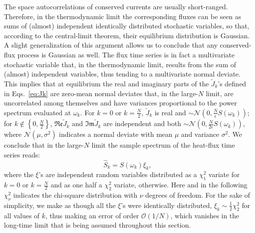 The space autocorrelations of conserved currents are usually short-ranged. Therefore, in the thermodynamic limit the corresponding fluxes can be seen as sums of (almost) independent identically distributed stochastic variables, so that, according to the central-limit theorem, their equilibrium distribution is Gaussian. A slight generalization of this argument allows us to conclude that any conserved-flux process is Gaussian as well. The flux time series is in fact a multivariate stochastic variable that, in the thermodynamic limit, results from the sum of (almost) independent variables, thus tending to a multivariate normal deviate. This implies that at equilibrium the real and imaginary parts of the $\tilde J_k$'s defined in Eqs.~\eqref{eq:Jk} are zero-mean normal deviates that, in the large-$N$ limit, are uncorrelated among themselves and have variances proportional to the power spectrum evaluated at $\omega_k$. For $k=0$ or $k=\frac{N}{2}$, $\tilde J_k$ is real and $\sim \mathcal{N}\left (0, \frac{N}{\epsilon}S(\omega_k) \right )$; for $k\notin\left\{ 0,\frac{N}{2}\right\}$, $\mathfrak{Re}\tilde{J}_k$ and $\mathfrak{Im}\tilde{J}_k$ are independent and both  $\sim \mathcal{N}\left (0, \frac{N}{2 \epsilon}S(\omega_k) \right )$, where $\mathcal{N} (\mu,\sigma^2)$ indicates a normal deviate with mean $\mu$ and variance $\sigma^2$. We conclude that in the large-$N$ limit the sample spectrum of the heat-flux time series reads:
\begin{equation}
\hat{S}_{k} = S \left(\omega_k\right) {\xi}_{k}, \label{eq:periodogram-distribution}
\end{equation}
where the $ {\xi}$'s are independent random variables distributed as a $\chi_1^2$ variate for $k=0$ or $k=\frac{N}{2}$ and as one half a $\chi_2^2$ variate, otherwise. Here and in the following $\chi^2_\nu$ indicates the chi-square distribution with $\nu$ degrees of freedom. For the sake of simplicity, we make as though all the ${\xi}$'s were identically distributed, $\xi_k \sim \frac{1}{2} \chi_2^2$ for all values of $k$, thus making an error of order $\mathcal{O}(1/N)$, which vanishes in the long-time limit that is being assumed throughout this section.

